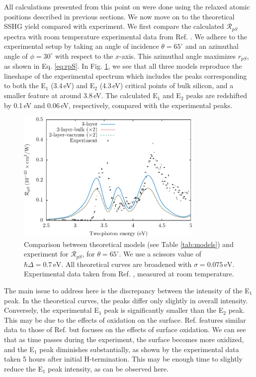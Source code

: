 \documentclass[11pt]{book}
\begin{document}
All calculations presented from this point on were done using the relaxed atomic
positions described in previous sections. We now move on to the theoretical SSHG
yield compared with experiment. We first compare the calculated
$\mathcal{R}_{pS}$ spectra with room temperature experimental data from Ref.
\cite{mejiaPRB02}. We adhere to the experimental setup by taking an angle
of incidence $\theta=65^{\circ}$ and an azimuthal angle of $\phi=30^\circ$ with
respect to the $x$-axis. This azimuthal angle maximizes $r_{pS}$, as shown in
Eq. \eqref{eq:rpS}. In Fig. \ref{fig:RpS}, we see that all three models
reproduce the lineshape of the experimental spectrum which includes the peaks
corresponding to both the E$_{1}$ (3.4\,eV) and E$_{2}$ (4.3\,eV) critical
points of bulk silicon, and a smaller feature at around 3.8\,eV. The calculated
E$_{1}$ and E$_{2}$ peaks are redshifted by 0.1\,eV and 0.06\,eV, respectively,
compared with the experimental peaks.


\begin{figure}
\centering
\includegraphics[width=0.8\textwidth]{../figures/04-results/fig-4_4_01}
\caption{Comparison between theoretical models (see Table
\ref{tab:models}) and experiment for $\mathcal{R}_{pS}$, for
$\theta=65^{\circ}$. We use a scissors value of $\hbar\Delta = 0.7\,\text{eV}$.
All theoretical curves are broadened with $\sigma=0.075\,\text{eV}$.
Experimental data taken from Ref. \cite{mejiaPRB02}, measured at room
temperature.}
\label{fig:RpS}
\end{figure}

The main issue to address here is the discrepancy between the intensity of the
E$_{1}$ peak. In the theoretical curves, the peaks differ only slightly in
overall intensity. Conversely, the experimental E$_{1}$ peak is significantly
smaller than the E$_{2}$ peak. This may be due to the effects of oxidation on
the surface. Ref. \cite{bergfeldPRL04} features similar data to those of
Ref. \cite{mejiaPRB02} but focuses on the effects of surface oxidation. We
can see that as time passes during the experiment, the surface becomes more
oxidized, and the E$_{1}$ peak diminishes substantially, as shown by the
experimental data taken 5 hours after initial H-termination. This may be enough
time to slightly reduce the E$_{1}$ peak intensity, as can be observed here.
\end{document}
